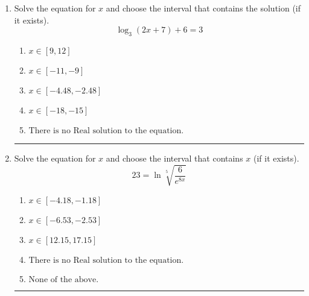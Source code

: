 \documentclass[14pt]{extbook}
\newcommand{\litem}[1]{\item#1\hspace*{-1cm}\rule{\textwidth}{0.4pt}}
\begin{document}
\begin{enumerate}
{\begin{enumerate}[label=\Alph*.]
\end{enumerate} }
\litem{
Solve the equation for $x$ and choose the interval that contains the solution (if it exists).\[ \log_{3}{(2x+7)}+6 = 3 \]\begin{enumerate}[label=\Alph*.]
\item \( x \in [9, 12] \)
\item \( x \in [-11, -9] \)
\item \( x \in [-4.48, -2.48] \)
\item \( x \in [-18, -15] \)
\item \( \text{There is no Real solution to the equation.} \)

\end{enumerate} }
\litem{
 Solve the equation for $x$ and choose the interval that contains $x$ (if it exists).\[  23 = \ln{\sqrt[5]{\frac{6}{e^{8x}}}} \]\begin{enumerate}[label=\Alph*.]
\item \( x \in [-4.18, -1.18] \)
\item \( x \in [-6.53, -2.53] \)
\item \( x \in [12.15, 17.15] \)
\item \( \text{There is no Real solution to the equation.} \)
\item \( \text{None of the above.} \)

\end{enumerate} }
\end{enumerate}
\end{document}
